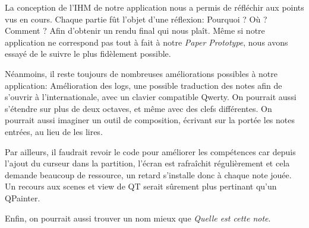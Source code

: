 \documentclass{article}
\begin{document}
La conception de l'IHM de notre application nous a permis de réfléchir aux points vus en cours. Chaque partie fût l'objet d'une réflexion: Pourquoi ? Où ? Comment ? Afin d'obtenir un rendu final qui nous plaît. Même si notre application ne correspond pas tout à fait à notre \emph{Paper Prototype}, nous avons essayé de le suivre le plus fidèlement possible. 

Néanmoins, il reste toujours de nombreuses améliorations possibles à notre application: Amélioration des logs, une possible traduction des notes afin de s'ouvrir à l'internationale, avec un clavier compatible Qwerty. On pourrait aussi s'étendre sur plus de deux octaves, et même avec des clefs différentes. On pourrait aussi imaginer un outil de composition, écrivant sur la portée les notes entrées, au lieu de les lires. 

Par ailleurs, il faudrait revoir le code pour améliorer les compétences 
car depuis l'ajout du curseur dans la partition, l'écran est rafraîchit régulièrement 
et cela demande beaucoup de ressource, un retard s'installe donc à chaque
note jouée.
Un recours aux scenes et view de QT serait sûrement plus pertinant qu'un
QPainter.

Enfin, on pourrait aussi trouver un nom mieux que \emph{Quelle est cette note}.
\end{document}
